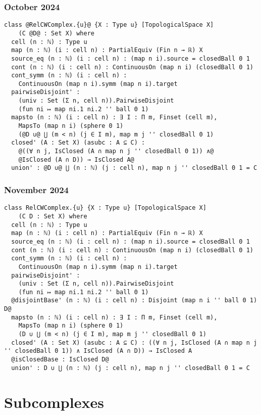 \documentclass{beamer}
\begin{document}
\begin{frame}[fragile]
\frametitle{October 2024}
\begin{lstlisting}[basicstyle=\ttfamily\scriptsize]
class @RelCWComplex.{u}@ {X : Type u} [TopologicalSpace X]
    (C @D@ : Set X) where
  cell (n : ℕ) : Type u
  map (n : ℕ) (i : cell n) : PartialEquiv (Fin n → ℝ) X
  source_eq (n : ℕ) (i : cell n) : (map n i).source = closedBall 0 1
  cont (n : ℕ) (i : cell n) : ContinuousOn (map n i) (closedBall 0 1)
  cont_symm (n : ℕ) (i : cell n) : 
    ContinuousOn (map n i).symm (map n i).target
  pairwiseDisjoint' :
    (univ : Set (Σ n, cell n)).PairwiseDisjoint 
    (fun ni ↦ map ni.1 ni.2 '' ball 0 1)
  mapsto (n : ℕ) (i : cell n) : ∃ I : Π m, Finset (cell m),
    MapsTo (map n i) (sphere 0 1) 
    (@D ∪@ ⋃ (m < n) (j ∈ I m), map m j '' closedBall 0 1)
  closed' (A : Set X) (asubc : A ⊆ C) :
    @((∀ n j, IsClosed (A ∩ map n j '' closedBall 0 1)) ∧@
    @IsClosed (A ∩ D)) → IsClosed A@
  union' : @D ∪@ ⋃ (n : ℕ) (j : cell n), map n j '' closedBall 0 1 = C
\end{lstlisting}
\end{frame}

\begin{frame}[fragile]
\frametitle{November 2024}
\begin{lstlisting}[basicstyle=\ttfamily\scriptsize]
class RelCWComplex.{u} {X : Type u} [TopologicalSpace X] 
    (C D : Set X) where
  cell (n : ℕ) : Type u
  map (n : ℕ) (i : cell n) : PartialEquiv (Fin n → ℝ) X
  source_eq (n : ℕ) (i : cell n) : (map n i).source = closedBall 0 1
  cont (n : ℕ) (i : cell n) : ContinuousOn (map n i) (closedBall 0 1)
  cont_symm (n : ℕ) (i : cell n) : 
    ContinuousOn (map n i).symm (map n i).target
  pairwiseDisjoint' :
    (univ : Set (Σ n, cell n)).PairwiseDisjoint 
    (fun ni ↦ map ni.1 ni.2 '' ball 0 1)
  @disjointBase' (n : ℕ) (i : cell n) : Disjoint (map n i '' ball 0 1) D@
  mapsto (n : ℕ) (i : cell n) : ∃ I : Π m, Finset (cell m),
    MapsTo (map n i) (sphere 0 1) 
    (D ∪ ⋃ (m < n) (j ∈ I m), map m j '' closedBall 0 1)
  closed' (A : Set X) (asubc : A ⊆ C) : ((∀ n j, IsClosed (A ∩ map n j '' closedBall 0 1)) ∧ IsClosed (A ∩ D)) → IsClosed A
  @isClosedBase : IsClosed D@
  union' : D ∪ ⋃ (n : ℕ) (j : cell n), map n j '' closedBall 0 1 = C
\end{lstlisting}
\end{frame}

\section{Subcomplexes}
\end{document}
